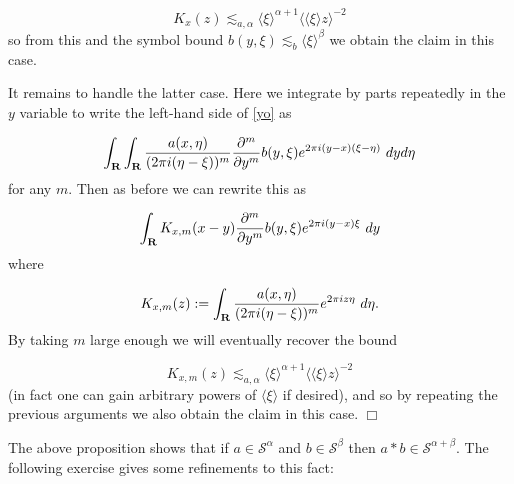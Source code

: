 \documentclass[11pt]{article}
\theoremstyle{definition}
\theoremstyle{remark}
\begin{document}
\[\displaystyle  K_x(z) \lesssim_{a,\alpha} \langle \xi \rangle^{\alpha+1} \langle \langle \xi \rangle z \rangle^{-2}\]
 so from this and the symbol bound \({b(y,\xi) \lesssim_b \langle \xi\rangle^\beta}\) we obtain the claim in this case.


It remains to handle the latter case. Here we integrate by parts repeatedly in the \({y}\) variable to write the left-hand side of \eqref{yo} as 

\[\displaystyle  \int_{\bf R} \int_{\bf R} \frac{a(x,\eta)}{(2\pi i(\eta-\xi))^m} \frac{\partial^m}{\partial y^m} b(y,\xi) e^{2\pi i (y-x)(\xi-\eta)}\ dy d\eta\]
 for any \({m}\). Then as before we can rewrite this as 

\[\displaystyle  \int_{\bf R} K_{x,m}(x-y) \frac{\partial^m}{\partial y^m} b(y,\xi) e^{2\pi i (y-x)\xi}\ dy\]
 where 

\[\displaystyle  K_{x,m}(z) := \int_{\bf R} \frac{a(x,\eta)}{(2\pi i(\eta-\xi))^m} e^{2\pi i z \eta}\ d\eta.\]
 By taking \({m}\) large enough we will eventually recover the bound 

\[\displaystyle  K_{x,m}(z) \lesssim_{a,\alpha} \langle \xi \rangle^{\alpha+1} \langle \langle \xi \rangle z \rangle^{-2}\]
 (in fact one can gain arbitrary powers of \({\langle \xi \rangle}\) if desired), and so by repeating the previous arguments we also obtain the claim in this case. \(\Box\)


The above proposition shows that if \({a \in {\mathcal S}^\alpha}\) and \({b \in {\mathcal S}^\beta}\) then \({a \ast b \in {\mathcal S}^{\alpha+\beta}}\). The following exercise gives some refinements to this fact:
\end{document}
